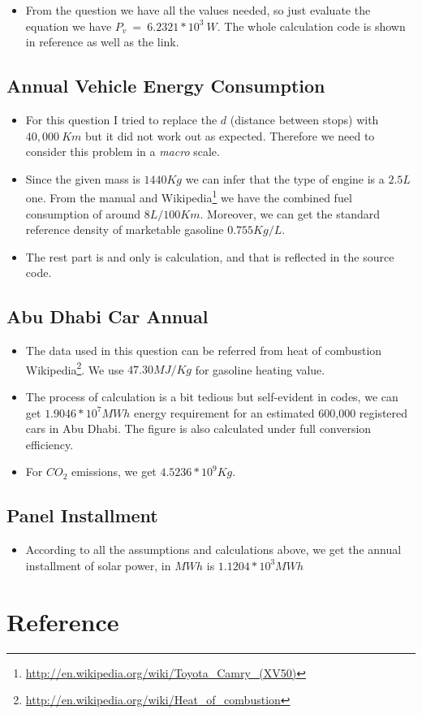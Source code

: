 \documentclass[12pt]{article}
\begin{document}
\begin{itemize}
\item From the question we have all the values needed, so just
  evaluate the equation we have $P_{v}~=~6.2321*10^{3}~W$. The whole
  calculation code is shown in reference as well as the link.
\end{itemize}

\subsection{Annual Vehicle Energy Consumption}
\label{sec:annu-vehicle-energy}
\begin{itemize}
\item For this question I tried to replace the $d$ (distance between
  stops) with $40,000~Km$ but it did not work out as
  expected. Therefore we need to consider this problem in a
  \emph{macro} scale.
\item Since the given mass is $1440Kg$ we can infer that the type of
  engine is a $2.5L$ one. From the manual and
  Wikipedia\footnote{\url{http://en.wikipedia.org/wiki/Toyota_Camry_(XV50)}}
  we have the combined fuel consumption of around
  $8L/100Km$. Moreover, we can get the standard reference density of
  marketable gasoline $0.755Kg/L$. 
\item The rest part is and only is calculation, and that is reflected
  in the source code.
\end{itemize}

\subsection{Abu Dhabi Car Annual}
\label{sec:abu-dhabi-car}

\begin{itemize}
\item The data used in this question can be referred from heat of
  combustion
  Wikipedia\footnote{\url{http://en.wikipedia.org/wiki/Heat_of_combustion}}. We
  use $47.30MJ/Kg$ for gasoline heating value.
\item The process of calculation is a bit tedious but self-evident in
  codes, we can get $1.9046*10^{7}MWh$ energy requirement for an
  estimated 600,000 registered cars in Abu Dhabi. The figure is also
  calculated under full  conversion efficiency.
\item For $CO_{2}$ emissions, we get $4.5236*10^{9}Kg$.
\end{itemize}

\subsection{Panel Installment}
\label{sec:panel-installment}

\begin{itemize}
\item According to all the assumptions and calculations above, we get
  the annual installment of solar power, in $MWh$ is $1.1204*10^{3}MWh$
\end{itemize}

\section{Reference}
\label{sec:reference}
\end{document}
